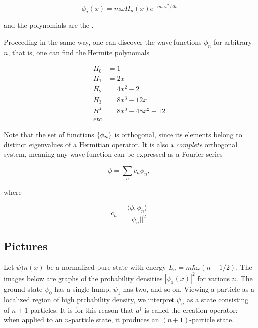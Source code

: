\begin{equation}
  \phi_n(x) = m\omega H_n(x)e^{ -m\omega  x^2/2  \hbar}
\end{equation}

and the polynomials are the .  

Proceeding in the same way, one can discover the wave functions $\phi_n$ for arbitrary $n$, that is, one can find the Hermite polynomals

\begin{align}
H_0 &= 1 \\
H_1 &= 2x \\
H_2 &= 4x^2 - 2 \\
H_3 &= 8x^3 - 12x \\
H^4 &= 8x^3 - 48x^2 + 12 \\
etc
\end{align}

Note that the set of functions $\{\phi_n\}$ is orthogonal, since its elements belong to distinct eigenvalues of a Hermitian operator.  It is also a \emph{complete} orthogonal system, meaning any wave function can be expressed as a Fourier series

\begin{equation}
\phi = \sum_n c_n \phi_n,
\end{equation}

where 

\begin{equation}
c_n = \frac{\langle \phi, \phi_n \rangle}{||\phi_n||^2}
\end{equation}


\subsection{Pictures}

Let $\psi)n(x)$ be a normalized pure state with energy $E_n = m\hbar \omega(n + 1/2)$.
The images below are graphs of the probability densities $|\psi_n(x)|^2$ for various $n$.  The ground state $\psi_0$ has a single hump, $\psi_1$ has two, and so on. Viewing a particle as a localized region of high probability density, we interpret $\psi_n$ as a state consisting of $n+1$ particles.  It is for this reason that $a^\dagger$ is called the creation operator: when applied to an $n$-particle state, it produces an $(n+1)$-particle state.




